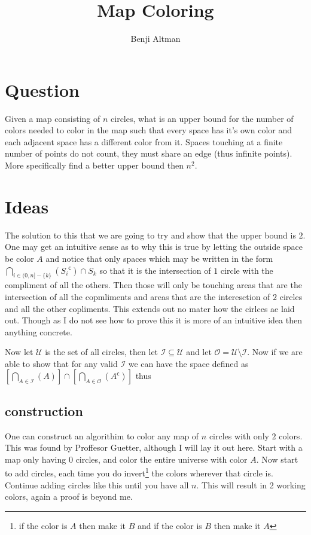 \documentclass{article}
\title{Map Coloring}
\author{Benji Altman}
\let\intersection\cap
\let\inter\intersection
\newcommand{\setcomp}[1]{{#1}^{\mathsf{c}}}
\newcommand{\biginter}[2]{\bigcap\limits_{#1} \left( {#2} \right)}
\begin{document}
\maketitle

\section{Question}
Given a map consisting of $n$ circles, what is an upper bound for the number of colors needed to color in the map such that every space has it's own color and each adjacent space has a different color from it. Spaces touching at a finite number of points do not count, they must share an edge (thus infinite points). More specifically find a better upper bound then $n^2$.

\section{Ideas}
The solution to this that we are going to try and show that the upper bound is $2$. One may get an intuitive sense as to why this is true by letting the outside space be color $A$ and notice that only spaces which may be written in the form $\biginter{i\in(0,n]-\{k\}}{\setcomp{S_i}} \inter S_k$ so that it is the intersection of $1$ circle with the compliment of all the others. Then those will only be touching areas that are the intersection of all the copmliments and areas that are the interesction of $2$ circles and all the other copliments. This extends out no mater how the cirlces ae laid out. Though as I do not see how to prove this it is more of an intuitive idea then anything concrete.

Now let $\mathscr U$ is the set of all circles, then let $\mathcal I \subseteq \mathscr U$ and let $\mathcal O = \mathscr U \setminus \mathcal I$. Now if we are able to show that for any valid $\mathcal I$ we can have the space defined as $\left[\biginter{A \in \mathcal I}{A}\right] \inter \left[\biginter{A \in \mathcal O}{\setcomp A}\right]$ thus 

\subsection{construction}
One can construct an algorithim to color any map of $n$ circles with only $2$ colors. This was found by Proffesor Guetter, although I will lay it out here. Start with a map only having $0$ circles, and color the entire universe with color $A$. Now start to add circles, each time you do invert\footnote{if the color is $A$ then make it $B$ and if the color is $B$ then make it $A$} the colors wherever that circle is. Continue adding circles like this until you have all $n$. This will result in 2 working colors, again a proof is beyond me.
\end{document}
